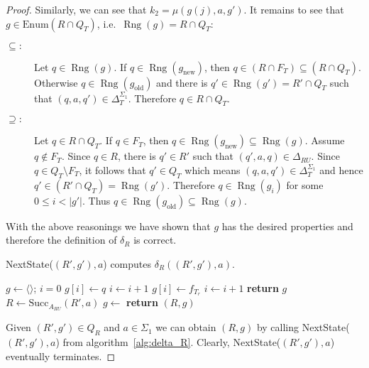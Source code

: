 \documentclass{article}
\newcommand{\len}[1]{\ensuremath{\left| #1 \right|}}
\DeclareMathOperator{\Rng}{Rng}
\begin{document}
\begin{proof}
		Similarly, we can see that $k_2 = \mu(g(j), a, g')$.
		It remains to see that $g\in \mathrm{Enum}(R\cap Q_T)$, i.e.\ $\Rng(g) = R\cap Q_T$:
		\begin{description}
			\item[$\subseteq:$] Let $q\in \Rng(g)$. If $q\in \Rng(g_\mathrm{new})$, then $q\in(R\cap F_T)\subseteq(R\cap Q_T)$.
			Otherwise $q\in \Rng(g_\mathrm{old})$ and there is $q'\in \Rng(g') = R'\cap Q_T$ such that $(q, a, q')\in \Delta_T^{\Sigma_1}$. Therefore $q\in R\cap Q_T$.
			\item[$\supseteq:$] Let $q\in R\cap Q_T$. If $q\in F_T$, then $q\in\Rng(g_\mathrm{new})\subseteq\Rng(g)$.
			Assume $q\notin F_T$. Since $q\in R$, there is $q'\in R'$ such that $(q', a, q)\in \Delta_{RU}$. Since $q\in Q_T\setminus F_T$, it follows that $q'\in Q_T$ which means $(q, a, q')\in \Delta_T^{\Sigma_1}$ and hence $q'\in (R'\cap Q_T) = \Rng(g')$.
			Therefore $q\in \Rng(g_i)$ for some $0\le i < \len{g'}$. Thus $q\in \Rng(g_\mathrm{old})\subseteq \Rng(g)$.
		\end{description}
		With the above reasonings we have shown that $g$ has the desired properties and therefore the definition of $\delta_R$ is correct.
\iffalse
		\begin{algorithm}
			\caption{NextState($(R', g'), a$) computes $\delta_R((R', g'), a)$.}
			\label{alg:delta_R}
			\begin{multicols}{2}
				\begin{algorithmic}[1]
					\State $g\gets \langle\rangle$; $i=0$
					\For{$j\gets 0$ \textbf{to} $\len{g'}-1$}
					\State $g[i]\gets q$
					\State $i\gets i+1$
					\EndIf
					\EndFor
					\EndFor
					 \label{alg:delta_R:NextSeq:for_final_states}
					\State $g[i]\gets f_{T_r}$
					\State $i\gets i+1$
					\EndIf
					\EndFor
					\State \textbf{return} $g$
					\EndFunction
					\columnbreak
					\State $R\gets \mathrm{Succ}_{A_{RU}}(R', a)$
					\State $g\gets$ 
					\State \textbf{return} $(R, g)$
					\EndFunction
				\end{algorithmic}
			\end{multicols}
		\end{algorithm}
		Given $(R', g')\in Q_R$ and $a\in \Sigma_1$ we can obtain $(R, g)$ by calling NextState($(R', g'), a$) from algorithm~\ref{alg:delta_R}.
		Clearly, NextState($(R', g'), a$) eventually terminates. 

\end{proof}
\end{document}
